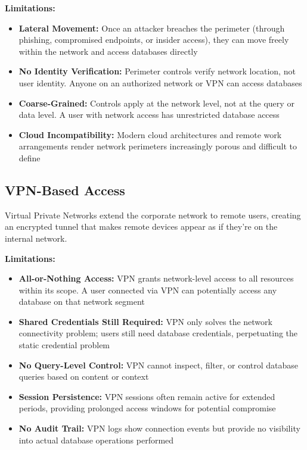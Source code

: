 \textbf{Limitations:}
\begin{itemize}
    \item \textbf{Lateral Movement:} Once an attacker breaches the perimeter (through phishing, compromised endpoints, or insider access), they can move freely within the network and access databases directly
    \item \textbf{No Identity Verification:} Perimeter controls verify network location, not user identity. Anyone on an authorized network or VPN can access databases
    \item \textbf{Coarse-Grained:} Controls apply at the network level, not at the query or data level. A user with network access has unrestricted database access
    \item \textbf{Cloud Incompatibility:} Modern cloud architectures and remote work arrangements render network perimeters increasingly porous and difficult to define
\end{itemize}

\subsection{VPN-Based Access}
Virtual Private Networks extend the corporate network to remote users, creating an encrypted tunnel that makes remote devices appear as if they're on the internal network.

\textbf{Limitations:}
\begin{itemize}
    \item \textbf{All-or-Nothing Access:} VPN grants network-level access to all resources within its scope. A user connected via VPN can potentially access any database on that network segment
    \item \textbf{Shared Credentials Still Required:} VPN only solves the network connectivity problem; users still need database credentials, perpetuating the static credential problem
    \item \textbf{No Query-Level Control:} VPN cannot inspect, filter, or control database queries based on content or context
    \item \textbf{Session Persistence:} VPN sessions often remain active for extended periods, providing prolonged access windows for potential compromise
    \item \textbf{No Audit Trail:} VPN logs show connection events but provide no visibility into actual database operations performed
\end{itemize}

